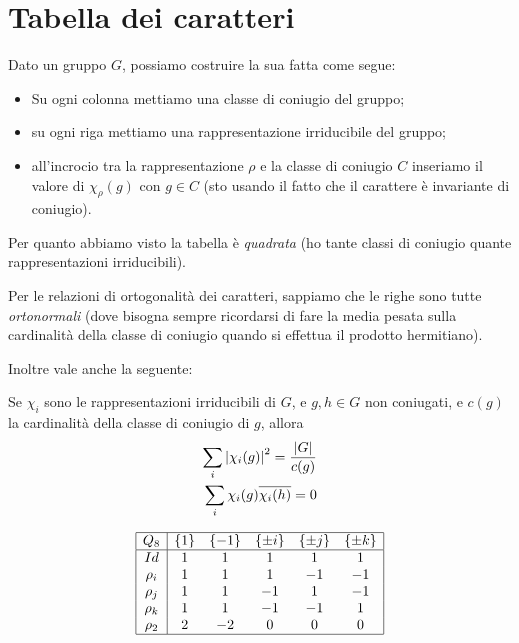 \section{Tabella dei caratteri}

Dato un gruppo $G$, possiamo costruire la sua  fatta come segue:
\begin{itemize}
  \item Su ogni colonna mettiamo una classe di coniugio del gruppo;
  \item su ogni riga mettiamo una rappresentazione irriducibile del gruppo;
  \item all'incrocio tra la rappresentazione $\rho$ e la classe di coniugio $C$ inseriamo il valore di $\chi_\rho(g)$ con $g\in C$ (sto usando il fatto che il carattere è invariante di coniugio).
\end{itemize}

Per quanto abbiamo visto la tabella è \emph{quadrata} (ho tante classi di coniugio quante rappresentazioni irriducibili).

Per le relazioni di ortogonalità dei caratteri, sappiamo che le righe sono tutte \emph{ortonormali} (dove bisogna sempre ricordarsi di fare la media pesata sulla cardinalità della classe di coniugio quando si effettua il prodotto hermitiano).

Inoltre vale anche la seguente:
\begin{myprop}
  Se $\chi_i$ sono le rappresentazioni irriducibili di $G$, e $g,h\in G$ non coniugati, e $c(g)$ la cardinalità della classe di coniugio di $g$, allora 
  \begin{align*}
    \sum_i \left|\chi_i(g)\right|^2 = \frac {\left|G\right|}{c(g)}\\
    \sum_i \chi_i(g)\overline{\chi_i(h)} = 0
  \end{align*}
\end{myprop}

\begin{myexample} 
  \[
  \begin{array}{|c|ccccc|}
  \hline
    Q_8    & \{1\} & \{-1\} & \{\pm i\} & \{\pm j\} & \{\pm k\} \\ \hline
    Id     &   1   &    1   &     1     &     1     &     1     \\ 
    \rho_i &   1   &    1   &     1     &    -1     &    -1     \\
    \rho_j &   1   &    1   &    -1     &     1     &    -1     \\
    \rho_k &   1   &    1   &    -1     &    -1     &     1     \\
    \rho_2 &   2   &   -2   &     0     &     0     &     0     \\ \hline
  \end{array}
  \]
  
  
\end{myexample}


